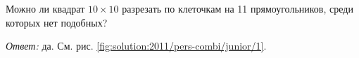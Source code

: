 Можно ли квадрат $10 \times 10$ разрезать по клеточкам на 11 прямоугольников,
среди которых нет подобных?

%
\label{solution:2011/pers-combi/junior/1}%
\emph{Ответ:} да.
См. рис. \ref{fig:solution:2011/pers-combi/junior/1}.

